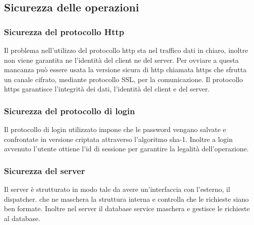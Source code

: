 \documentclass[12pt,a4]{article}
\begin{document}
\subsection{Sicurezza delle operazioni}
\subsubsection{Sicurezza del protocollo Http}
Il problema nell'utilizzo del protocollo http sta nel traffico dati in chiaro, inoltre non viene garantita ne l'identità del client ne del server. Per ovviare a questa mancanza può essere usata la versione sicura di http chiamata https che sfrutta un canale cifrato, mediante protocollo SSL, per la comunicazione. Il protocollo https garantisce l'integrità dei dati, l'identità del client e del server.

\subsubsection{Sicurezza del protocollo di login}
Il protocollo di login utilizzato impone che le password vengano salvate e confrontate in versione criptata attraverso l'algoritmo sha-1. Inoltre a login avvenuto l'utente ottiene l'id di sessione per garantire la legalità dell'operazione. 

\subsubsection{Sicurezza del server}
Il server è strutturato in modo tale da avere un'interfaccia con l'esterno, il dispatcher. che ne maschera la struttura interna e controlla che le richieste siano ben formate. Inoltre nel server il database service maschera e gestisce le richieste al database.
\end{document}
